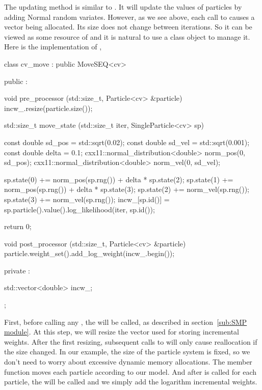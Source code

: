 \documentclass[11pt, bib, hyper, mint, minted=cache]{marticle}
\begin{document}
The updating method  is similar to . It
will update the values of particles by adding Normal random variates. However,
as we see above, each call to  causes a
 vector being allocated. Its size does not change
between iterations. So it can be viewed as some resource of
 and it is natural to use a class object to manage it. Here
is the implementation of ,
\begin{cppcode}
class cv_move : public MoveSEQ<cv>
{
    public :

    void pre_processor (std::size_t, Particle<cv> &particle)
    {incw_.resize(particle.size());}

    std::size_t move_state (std::size_t iter, SingleParticle<cv> sp)
    {
        const double sd_pos = std::sqrt(0.02);
        const double sd_vel = std::sqrt(0.001);
        const double delta = 0.1;
        cxx11::normal_distribution<double> norm_pos(0, sd_pos);
        cxx11::normal_distribution<double> norm_vel(0, sd_vel);

        sp.state(0) += norm_pos(sp.rng()) + delta * sp.state(2);
        sp.state(1) += norm_pos(sp.rng()) + delta * sp.state(3);
        sp.state(2) += norm_vel(sp.rng());
        sp.state(3) += norm_vel(sp.rng());
        incw_[sp.id()] = sp.particle().value().log_likelihood(iter, sp.id());

        return 0;
    }

    void post_processor (std::size_t, Particle<cv> &particle)
    {particle.weight_set().add_log_weight(incw_.begin());}

    private :

    std::vector<double> incw_;
};
\end{cppcode}
First, before calling any , the
 will be called, as described in section~\ref{sub:SMP
  module}. At this step, we will resize the vector used for storing
incremental weights. After the first resizing, subsequent calls to
 will only cause reallocation if the size changed. In our
example, the size of the particle system is fixed, so we don't need to worry
about excessive dynamic memory allocations. The  member
function moves each particle according to our model. And after
 is called for each particle, the
 will be called and we simply add the logarithm
incremental weights.
\end{document}
